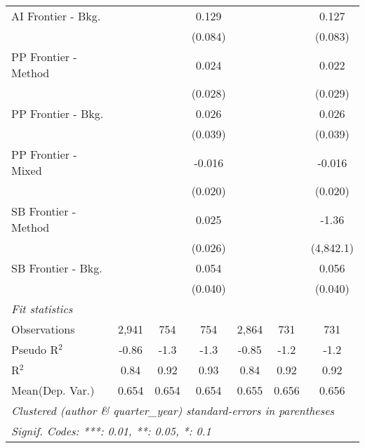 \begin{tabular}{lcccccc}
   AI Frontier - Bkg.   &                &         & 0.129        &               &             & 0.127\\   
                        &                &         & (0.084)      &               &             & (0.083)\\   
   PP Frontier - Method &                &         & 0.024        &               &             & 0.022\\   
                        &                &         & (0.028)      &               &             & (0.029)\\   
   PP Frontier - Bkg.   &                &         & 0.026        &               &             & 0.026\\   
                        &                &         & (0.039)      &               &             & (0.039)\\   
   PP Frontier - Mixed  &                &         & -0.016       &               &             & -0.016\\   
                        &                &         & (0.020)      &               &             & (0.020)\\   
   SB Frontier - Method &                &         & 0.025        &               &             & -1.36\\   
                        &                &         & (0.026)      &               &             & (4,842.1)\\   
   SB Frontier - Bkg.   &                &         & 0.054        &               &             & 0.056\\   
                        &                &         & (0.040)      &               &             & (0.040)\\   
   \midrule
   \emph{Fit statistics}\\
   Observations         & 2,941          & 754     & 754          & 2,864         & 731         & 731\\  
   Pseudo R$^2$         & -0.86          & -1.3    & -1.3         & -0.85         & -1.2        & -1.2\\  
   R$^2$                & 0.84           & 0.92    & 0.93         & 0.84          & 0.92        & 0.92\\  
Mean(Dep. Var.) & 0.654 & 0.654 & 0.654 & 0.655 & 0.656 & 0.656 \\
   \midrule \midrule
   \multicolumn{7}{l}{\emph{Clustered (author \& quarter\_year) standard-errors in parentheses}}\\
   \multicolumn{7}{l}{\emph{Signif. Codes: ***: 0.01, **: 0.05, *: 0.1}}\\
\end{tabular}
\par\endgroup

